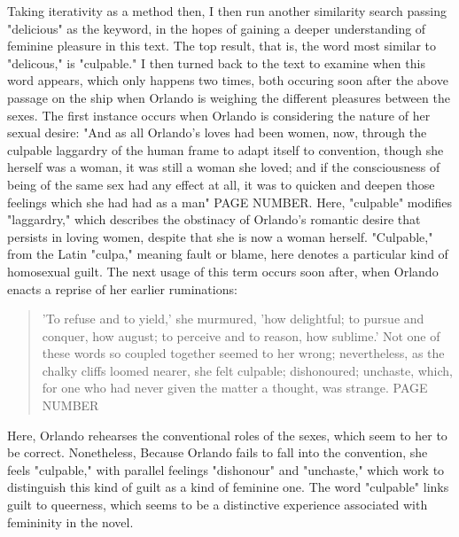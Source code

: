 \documentclass[11pt]{article}
\begin{document}
Taking iterativity as a method then, I then run another similarity
search passing "delicious" as the keyword, in the hopes of gaining a
deeper understanding of feminine pleasure in this text. The top
result, that is, the word most similar to "delicous," is "culpable."
I then turned back to the text to examine when this word appears,
which only happens two times, both occuring soon after the above
passage on the ship when Orlando is weighing the different pleasures
between the sexes. The first instance occurs when Orlando is
considering the nature of her sexual desire: "And as all Orlando's
loves had been women, now, through the culpable laggardry of the human
frame to adapt itself to convention, though she herself was a woman,
it was still a woman she loved; and if the consciousness of being of
the same sex had any effect at all, it was to quicken and deepen those
feelings which she had had as a man" PAGE NUMBER. Here, "culpable"
modifies "laggardry," which describes the obstinacy of Orlando's
romantic desire that persists in loving women, despite that she is now
a woman herself. "Culpable," from the Latin "culpa," meaning fault or
blame, here denotes a particular kind of homosexual guilt. The next
usage of this term occurs soon after, when Orlando enacts a reprise of
her earlier ruminations: 
\begin{quote}
'To refuse and to yield,' she murmured, 'how delightful; to pursue and
conquer, how august; to perceive and to reason, how sublime.'  Not one
of these words so coupled together seemed to her wrong; nevertheless,
as the chalky cliffs loomed nearer, she felt culpable; dishonoured;
unchaste, which, for one who had never given the matter a thought, was
strange. PAGE NUMBER
\end{quote}
Here, Orlando rehearses the conventional roles of the sexes, which
seem to her to be correct. Nonetheless, Because Orlando fails to fall
into the convention, she feels "culpable," with parallel feelings
"dishonour" and "unchaste," which work to distinguish this kind of
guilt as a kind of feminine one. The word "culpable" links guilt to
queerness, which seems to be a distinctive experience associated with
femininity in the novel.
\end{document}
